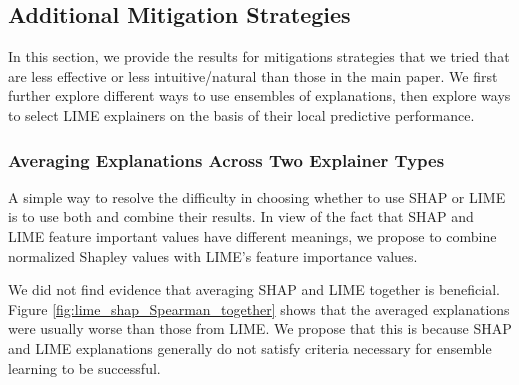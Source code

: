 \documentclass[mnsc,blindrev]{informs3}
\begin{document}
    
    \subsection{Additional Mitigation Strategies}
        \label{sec:appendix_mitigations}
        In this section, we provide the results for mitigations strategies that we tried that are less effective or less intuitive/natural than those in the main paper. We first further explore different ways to use ensembles of explanations, then explore ways to select LIME explainers on the basis of their local predictive performance. 
        
        \subsubsection{Averaging Explanations Across Two Explainer Types}
            \label{sec:averaging_across_explainers}
            A simple way to resolve the difficulty in choosing whether to use SHAP or LIME is to use both and combine their results. In view of the fact that SHAP and LIME feature important values have different meanings, we propose to combine normalized Shapley values with LIME's feature importance values. 

            We did not find evidence that averaging SHAP and LIME together is beneficial. Figure \ref{fig:lime_shap_Spearman_together} shows that the averaged explanations were usually worse than those from LIME. We propose that this is because SHAP and LIME explanations generally do not satisfy criteria necessary for ensemble learning to be successful.   
\end{document}
